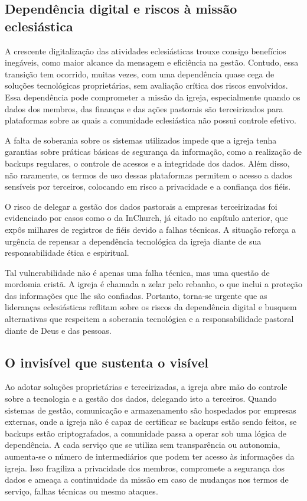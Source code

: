 \subsection{Dependência digital e riscos à missão eclesiástica}

A crescente digitalização das atividades eclesiásticas trouxe consigo benefícios inegáveis, como maior alcance da mensagem e eficiência na gestão. Contudo, essa transição tem ocorrido, muitas vezes, com uma dependência quase cega de soluções tecnológicas proprietárias, sem avaliação crítica dos riscos envolvidos. Essa dependência pode comprometer a missão da igreja, especialmente quando os dados dos membros, das finanças e das ações pastorais são terceirizados para plataformas sobre as quais a comunidade eclesiástica não possui controle efetivo.

A falta de soberania sobre os sistemas utilizados impede que a igreja tenha garantias sobre práticas básicas de segurança da informação, como a realização de backups regulares, o controle de acessos e a integridade dos dados. Além disso, não raramente, os termos de uso dessas plataformas permitem o acesso a dados sensíveis por terceiros, colocando em risco a privacidade e a confiança dos fiéis.

O risco de delegar a gestão dos dados pastorais a empresas terceirizadas foi evidenciado por casos como o da InChurch\cite{almeida_inchurch_2024}, já citado no capítulo anterior, que expôs milhares de registros de fiéis devido a falhas técnicas. A situação reforça a urgência de repensar a dependência tecnológica da igreja diante de sua responsabilidade ética e espiritual.

Tal vulnerabilidade não é apenas uma falha técnica, mas uma questão de mordomia cristã. A igreja é chamada a zelar pelo rebanho, o que inclui a proteção das informações que lhe são confiadas. Portanto, torna-se urgente que as lideranças eclesiásticas reflitam sobre os riscos da dependência digital e busquem alternativas que respeitem a soberania tecnológica e a responsabilidade pastoral diante de Deus e das pessoas.

\subsection{O invisível que sustenta o visível}

Ao adotar soluções proprietárias e terceirizadas, a igreja abre mão do controle sobre a tecnologia e a gestão dos dados, delegando isto a terceiros. Quando sistemas de gestão, comunicação e armazenamento são hospedados por empresas externas, onde a igreja não é capaz de certificar se backups estão sendo feitos, se backups estão criptografados, a comunidade passa a operar sob uma lógica de dependência. A cada serviço que se utiliza sem transparência ou autonomia, aumenta-se o número de intermediários que podem ter acesso às informações da igreja. Isso fragiliza a privacidade dos membros, compromete a segurança dos dados e ameaça a continuidade da missão em caso de mudanças nos termos de serviço, falhas técnicas ou mesmo ataques.

